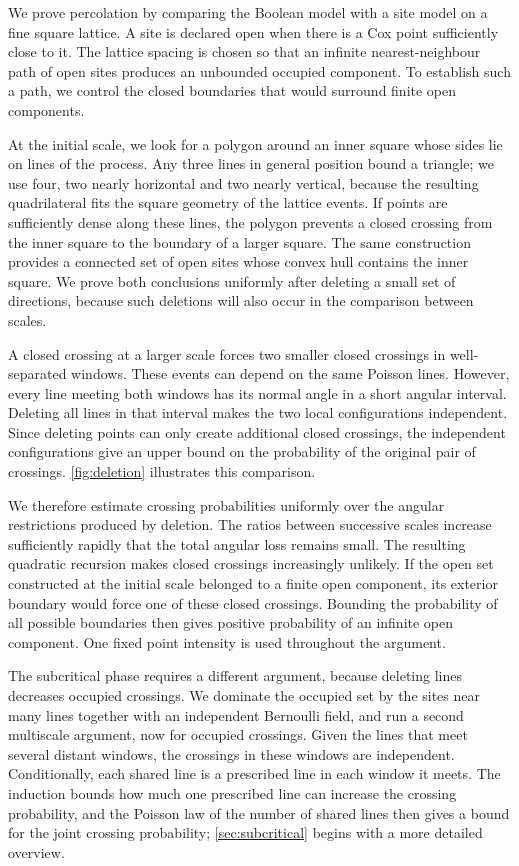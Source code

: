 \documentclass[11pt,letterpaper]{article}
\begin{document}
We prove percolation by comparing the Boolean model with a site model on a fine square lattice. A site is declared open when there is a Cox point sufficiently close to it. The lattice spacing is chosen so that an infinite nearest-neighbour path of open sites produces an unbounded occupied component. To establish such a path, we control the closed boundaries that would surround finite open components.

At the initial scale, we look for a polygon around an inner square whose sides lie on lines of the process. Any three lines in general position bound a triangle; we use four, two nearly horizontal and two nearly vertical, because the resulting quadrilateral fits the square geometry of the lattice events. If points are sufficiently dense along these lines, the polygon prevents a closed crossing from the inner square to the boundary of a larger square. The same construction provides a connected set of open sites whose convex hull contains the inner square. We prove both conclusions uniformly after deleting a small set of directions, because such deletions will also occur in the comparison between scales.

A closed crossing at a larger scale forces two smaller closed crossings in well-separated windows. These events can depend on the same Poisson lines. However, every line meeting both windows has its normal angle in a short angular interval. Deleting all lines in that interval makes the two local configurations independent. Since deleting points can only create additional closed crossings, the independent configurations give an upper bound on the probability of the original pair of crossings. \cref{fig:deletion} illustrates this comparison.

We therefore estimate crossing probabilities uniformly over the angular restrictions produced by deletion. The ratios between successive scales increase sufficiently rapidly that the total angular loss remains small. The resulting quadratic recursion makes closed crossings increasingly unlikely. If the open set constructed at the initial scale belonged to a finite open component, its exterior boundary would force one of these closed crossings. Bounding the probability of all possible boundaries then gives positive probability of an infinite open component. One fixed point intensity is used throughout the argument.

The subcritical phase requires a different argument, because deleting lines decreases occupied crossings. We dominate the occupied set by the sites near many lines together with an independent Bernoulli field, and run a second multiscale argument, now for occupied crossings. Given the lines that meet several distant windows, the crossings in these windows are independent. Conditionally, each shared line is a prescribed line in each window it meets. The induction bounds how much one prescribed line can increase the crossing probability, and the Poisson law of the number of shared lines then gives a bound for the joint crossing probability; \cref{sec:subcritical} begins with a more detailed overview.
\end{document}

